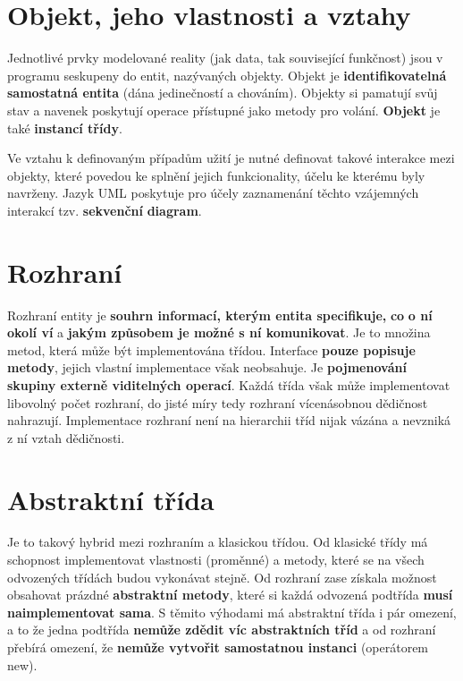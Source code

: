 \section{Objekt, jeho vlastnosti a vztahy}
Jednotlivé prvky modelované reality (jak data, tak související funkčnost) jsou v programu seskupeny do entit, nazývaných objekty. Objekt je \textbf{identifikovatelná samostatná entita} (dána jedinečností a chováním). Objekty si pamatují svůj stav a navenek poskytují operace přístupné jako metody pro volání. \textbf{Objekt} je také \textbf{instancí třídy}.

Ve vztahu k definovaným případům užití je nutné definovat takové interakce mezi objekty, které povedou ke splnění jejich funkcionality, účelu ke kterému byly navrženy. Jazyk UML poskytuje pro účely zaznamenání těchto vzájemných interakcí tzv. \textbf{sekvenční} \textbf{diagram}.

\section{Rozhraní}
Rozhraní entity je \textbf{souhrn informací, kterým entita specifikuje,} \textbf{co} \textbf{o ní okolí ví} a\textbf{ jakým způsobem je možné s ní komunikovat}. Je to množina metod, která může být implementována třídou. Interface \textbf{pouze popisuje metody}, jejich vlastní implementace však neobsahuje. Je \textbf{pojmenování skupiny externě viditelných operací}. Každá třída však může implementovat libovolný počet rozhraní, do jisté míry tedy rozhraní vícenásobnou dědičnost nahrazují. Implementace rozhraní není na hierarchii tříd nijak vázána a nevzniká z ní vztah dědičnosti.

\section{Abstraktní třída}
Je to takový hybrid mezi rozhraním a klasickou třídou. Od klasické třídy má schopnost implementovat vlastnosti (proměnné) a metody, které se na všech odvozených třídách budou vykonávat stejně. Od rozhraní zase získala možnost obsahovat prázdné \textbf{abstraktní metody}, které si každá odvozená podtřída \textbf{musí naimplementovat sama}. S těmito výhodami má abstraktní třída i pár omezení, a to že jedna podtřída \textbf{nemůže zdědit víc abstraktních tříd} a od rozhraní přebírá omezení, že \textbf{nemůže vytvořit samostatnou instanci} (operátorem new).

